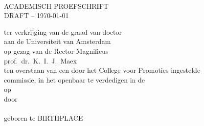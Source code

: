 
%
%

\pagestyle{empty}
\setlength\parindent{0pt}

\makeatletter
{}
\makeatother



\begin{minipage}[c][190mm][c]{124mm}  %
\makeatletter
\begin{center}
	\vspace*{1.2cm}

	{ \huge \bf \@title }\\[2.7cm]

	\textsc{\Large ACADEMISCH PROEFSCHRIFT}\\[1.2cm]
	\ifdraft \textsc{\Large DRAFT -- \today}\\[1.0cm] \fi
	
	\linespread{1.2}
	\large \textrm{
		ter verkrijging van de graad van doctor \\
		aan de Universiteit van Amsterdam \\
		op gezag van de Rector Magnificus \\
		prof.~dr.~K.~I.~J.~Maex \\
		ten overstaan van een door het College voor Promoties ingestelde \\
		commissie, in het openbaar te verdedigen in de \@location \\
		op \@date \\ 
		\vspace{0.9cm}
		door \\[0.3cm]
		\vspace{0.9cm}
		{\bf \@author}\\[0.3cm]
 		geboren te BIRTHPLACE \\[0.3cm]  
	 }
\end{center}
\makeatother
\end{minipage}

